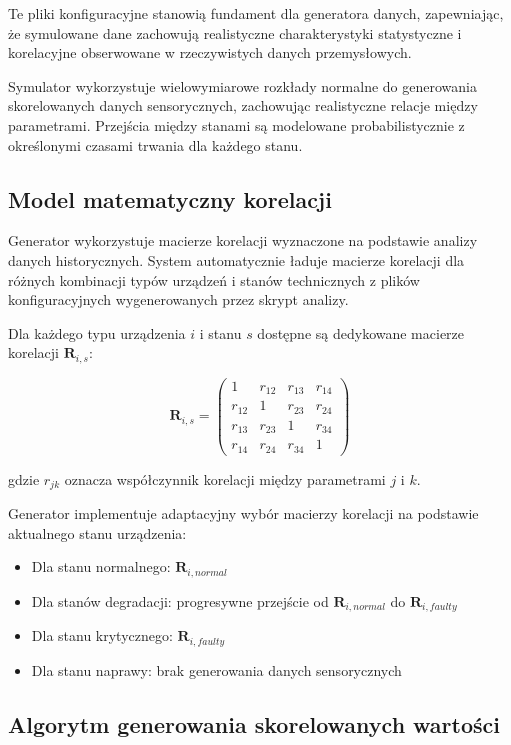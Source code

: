 Te pliki konfiguracyjne stanowią fundament dla generatora danych, zapewniając, że symulowane dane zachowują realistyczne charakterystyki statystyczne i korelacyjne obserwowane w rzeczywistych danych przemysłowych.

Symulator wykorzystuje wielowymiarowe rozkłady normalne do generowania skorelowanych danych sensorycznych, zachowując realistyczne relacje między parametrami. Przejścia między stanami są modelowane probabilistycznie z określonymi czasami trwania dla każdego stanu.


\subsection{Model matematyczny korelacji}
\label{subsec:model_korelacji}

Generator wykorzystuje macierze korelacji wyznaczone na podstawie analizy danych historycznych. System automatycznie ładuje macierze korelacji dla różnych kombinacji typów urządzeń i stanów technicznych z plików konfiguracyjnych wygenerowanych przez skrypt analizy.

Dla każdego typu urządzenia $i$ i stanu $s$ dostępne są dedykowane macierze korelacji $\mathbf{R}_{i,s}$:

$$\mathbf{R}_{i,s} = \begin{pmatrix}
1 & r_{12} & r_{13} & r_{14} \\
r_{12} & 1 & r_{23} & r_{24} \\
r_{13} & r_{23} & 1 & r_{34} \\
r_{14} & r_{24} & r_{34} & 1
\end{pmatrix}$$

gdzie $r_{jk}$ oznacza współczynnik korelacji między parametrami $j$ i $k$.

Generator implementuje adaptacyjny wybór macierzy korelacji na podstawie aktualnego stanu urządzenia:
\begin{itemize}
    \item Dla stanu normalnego: $\mathbf{R}_{i,normal}$
    \item Dla stanów degradacji: progresywne przejście od $\mathbf{R}_{i,normal}$ do $\mathbf{R}_{i,faulty}$
    \item Dla stanu krytycznego: $\mathbf{R}_{i,faulty}$
    \item Dla stanu naprawy: brak generowania danych sensorycznych
\end{itemize}

\subsection{Algorytm generowania skorelowanych wartości}
\label{subsec:algorytm_generowania}


